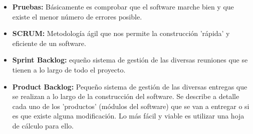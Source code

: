 \begin{itemize}
	\item \textbf{Pruebas:} Básicamente es comprobar que el software marche bien y que existe el menor número de errores posible.
	\item \textbf{SCRUM:} Metodología ágil que nos permite la construcción 'rápida' y eficiente de un software.
	\item \textbf{Sprint Backlog:} equeño sistema de gestión de las diversas reuniones que se tienen a lo largo de todo el proyecto.
	\item \textbf{Product Backlog:} Pequeño sistema de gestión de las diversas entregas que se realizan a lo largo de la construcción del software. Se describe a detalle cada uno de los 'productos' (módulos del software) que se van a entregar o si es que existe alguna modificación. Lo más fácil y viable es utilizar una hoja de cálculo para ello.
\end{itemize}